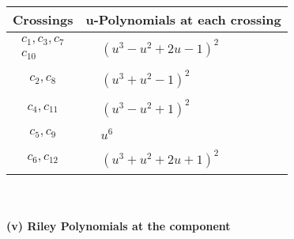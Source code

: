 \documentclass[1p]{elsarticle_modified}
\theoremstyle{definition}
\begin{document}
\begin{tabular}{m{50pt}|m{274pt}}
Crossings & \hspace{64pt}u-Polynomials at each crossing \\
\hline $$\begin{aligned}c_{1},c_{3},c_{7}\\c_{10}\end{aligned}$$&$\begin{aligned}
&(u^3- u^2+2 u-1)^2
\end{aligned}$\\
\hline $$\begin{aligned}c_{2},c_{8}\end{aligned}$$&$\begin{aligned}
&(u^3+u^2-1)^2
\end{aligned}$\\
\hline $$\begin{aligned}c_{4},c_{11}\end{aligned}$$&$\begin{aligned}
&(u^3- u^2+1)^2
\end{aligned}$\\
\hline $$\begin{aligned}c_{5},c_{9}\end{aligned}$$&$\begin{aligned}
&u^6
\end{aligned}$\\
\hline $$\begin{aligned}c_{6},c_{12}\end{aligned}$$&$\begin{aligned}
&(u^3+u^2+2 u+1)^2
\end{aligned}$\\
\hline
\end{tabular}\\~\\
\newpage\renewcommand{\arraystretch}{1}
\flushleft \textbf{(v) Riley Polynomials at the component}\newline \\
\end{document}
